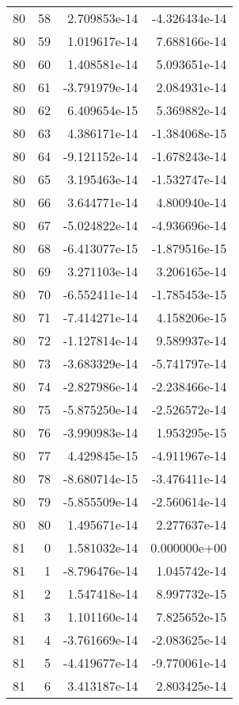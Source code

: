 \begin{tabular}{rrrr}
  80 &   58 &  2.709853e-14 & -4.326434e-14 \\
  80 &   59 &  1.019617e-14 &  7.688166e-14 \\
  80 &   60 &  1.408581e-14 &  5.093651e-14 \\
  80 &   61 & -3.791979e-14 &  2.084931e-14 \\
  80 &   62 &  6.409654e-15 &  5.369882e-14 \\
  80 &   63 &  4.386171e-14 & -1.384068e-15 \\
  80 &   64 & -9.121152e-14 & -1.678243e-14 \\
  80 &   65 &  3.195463e-14 & -1.532747e-14 \\
  80 &   66 &  3.644771e-14 &  4.800940e-14 \\
  80 &   67 & -5.024822e-14 & -4.936696e-14 \\
  80 &   68 & -6.413077e-15 & -1.879516e-15 \\
  80 &   69 &  3.271103e-14 &  3.206165e-14 \\
  80 &   70 & -6.552411e-14 & -1.785453e-15 \\
  80 &   71 & -7.414271e-14 &  4.158206e-15 \\
  80 &   72 & -1.127814e-14 &  9.589937e-14 \\
  80 &   73 & -3.683329e-14 & -5.741797e-14 \\
  80 &   74 & -2.827986e-14 & -2.238466e-14 \\
  80 &   75 & -5.875250e-14 & -2.526572e-14 \\
  80 &   76 & -3.990983e-14 &  1.953295e-15 \\
  80 &   77 &  4.429845e-15 & -4.911967e-14 \\
  80 &   78 & -8.680714e-15 & -3.476411e-14 \\
  80 &   79 & -5.855509e-14 & -2.560614e-14 \\
  80 &   80 &  1.495671e-14 &  2.277637e-14 \\
  81 &    0 &  1.581032e-14 &  0.000000e+00 \\
  81 &    1 & -8.796476e-14 &  1.045742e-14 \\
  81 &    2 &  1.547418e-14 &  8.997732e-15 \\
  81 &    3 &  1.101160e-14 &  7.825652e-15 \\
  81 &    4 & -3.761669e-14 & -2.083625e-14 \\
  81 &    5 & -4.419677e-14 & -9.770061e-14 \\
  81 &    6 &  3.413187e-14 &  2.803425e-14 \\

\end{tabular}
